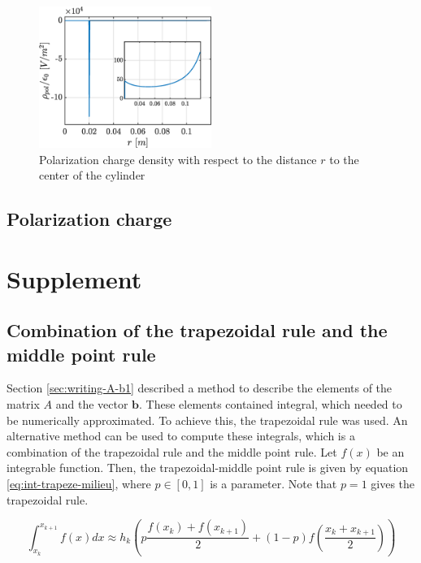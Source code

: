 \documentclass[a4paper,12pt,twoside]{article}
\newcommand{\mbf}[1]{\mathbf{#1}} %
\newcommand{\bracket}[1]{\left(#1\right)}
\begin{document}

    \begin{figure}[h]
      \centering
      \includegraphics[width=0.5\textwidth]{graphs/exdii-rhopol.eps}
      \caption{Polarization charge density with respect to the distance $r$ to the center of the cylinder}
      \label{fig:rhopol}
    \end{figure}


  \subsection{Polarization charge} \lipsum[1-1]




  \section{Supplement} %
    \subsection{Combination of the trapezoidal rule and the middle point rule} \label{sec:trapezoidal-middle-rule}
      Section \ref{sec:writing-A-b1} described a method to describe the elements of the matrix $A$ and the vector $\mbf{b}$.
      These elements contained integral, which needed to be numerically approximated.
      To achieve this, the trapezoidal rule was used.
      An alternative method can be used to compute these integrals, which is a combination of the trapezoidal rule and the middle point rule.
      Let $f\bracket{x}$ be an integrable function.
      Then, the trapezoidal-middle point rule is given by equation \eqref{eq:int-trapeze-milieu}, where $p\in[0,1]$ is a parameter. Note that $p=1$ gives the trapezoidal rule.

      \begin{equation}
        \int_{x_k}^{x_{k+1}}f\bracket{x}dx \approx h_k\bracket{p\frac{f\bracket{x_k} + f\bracket{x_{k+1}}}{2} + \bracket{1-p}f\bracket{\frac{x_k + x_{k+1}}{2}}}
        \label{eq:int-trapeze-milieu}
      \end{equation}
\end{document}
